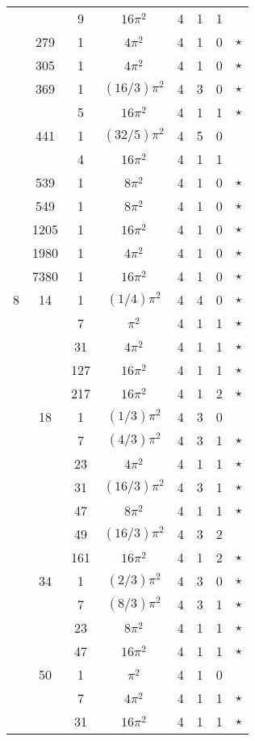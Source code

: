 \documentclass[12pt]{amsart}
\begin{document}
\begin{tabular}{ccc|ccccc}
 &  & 9 & $16\pi^2$ & 4 & 1 & 1 &  \\
 & 279 & 1 & $4\pi^2$ & 4 & 1 & 0 & $\star$ \\
 & 305 & 1 & $4\pi^2$ & 4 & 1 & 0 & $\star$ \\
 & 369 & 1 & $(16/3)\pi^2$ & 4 & 3 & 0 & $\star$ \\
 &  & 5 & $16\pi^2$ & 4 & 1 & 1 & $\star$ \\
 & 441 & 1 & $(32/5)\pi^2$ & 4 & 5 & 0 &  \\
 &  & 4 & $16\pi^2$ & 4 & 1 & 1 &  \\
 & 539 & 1 & $8\pi^2$ & 4 & 1 & 0 & $\star$ \\
 & 549 & 1 & $8\pi^2$ & 4 & 1 & 0 & $\star$ \\
 & 1205 & 1 & $16\pi^2$ & 4 & 1 & 0 & $\star$ \\
 & 1980 & 1 & $4\pi^2$ & 4 & 1 & 0 & $\star$ \\
 & 7380 & 1 & $16\pi^2$ & 4 & 1 & 0 & $\star$ \\
8 & 14 & 1 & $(1/4)\pi^2$ & 4 & 4 & 0 & $\star$ \\
 &  & 7 & $\pi^2$ & 4 & 1 & 1 & $\star$ \\
 &  & 31 & $4\pi^2$ & 4 & 1 & 1 & $\star$ \\
 &  & 127 & $16\pi^2$ & 4 & 1 & 1 & $\star$ \\
 &  & 217 & $16\pi^2$ & 4 & 1 & 2 & $\star$ \\
 & 18 & 1 & $(1/3)\pi^2$ & 4 & 3 & 0 &  \\
 &  & 7 & $(4/3)\pi^2$ & 4 & 3 & 1 & $\star$ \\
 &  & 23 & $4\pi^2$ & 4 & 1 & 1 & $\star$ \\
 &  & 31 & $(16/3)\pi^2$ & 4 & 3 & 1 & $\star$ \\
 &  & 47 & $8\pi^2$ & 4 & 1 & 1 & $\star$ \\
 &  & 49 & $(16/3)\pi^2$ & 4 & 3 & 2 &  \\
 &  & 161 & $16\pi^2$ & 4 & 1 & 2 & $\star$ \\
 & 34 & 1 & $(2/3)\pi^2$ & 4 & 3 & 0 & $\star$ \\
 &  & 7 & $(8/3)\pi^2$ & 4 & 3 & 1 & $\star$ \\
 &  & 23 & $8\pi^2$ & 4 & 1 & 1 & $\star$ \\
 &  & 47 & $16\pi^2$ & 4 & 1 & 1 & $\star$ \\
 & 50 & 1 & $\pi^2$ & 4 & 1 & 0 &  \\
 &  & 7 & $4\pi^2$ & 4 & 1 & 1 & $\star$ \\
 &  & 31 & $16\pi^2$ & 4 & 1 & 1 & $\star$ \\

\end{tabular}
\end{document}
